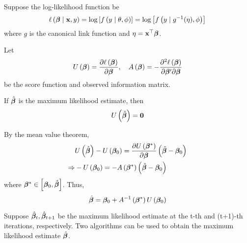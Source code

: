 Suppose the log-likelihood function be
\begin{equation}
	\ell\left(\boldsymbol{\beta}\mid{\bf x},y\right)=\log\left[f\left(y\mid\theta,\phi\right)\right]=\log\left[f\left(y\mid g^{-1}(\eta),\phi\right)\right]
\end{equation}
where $g$ is the canonical link function and $\eta={\bf x}^{\top}\boldsymbol{\beta}$.

Let
\begin{equation*}
	U\left(\boldsymbol{\beta}\right)=\frac{\partial\ell\left(\boldsymbol{\beta}\right)}{\partial\boldsymbol{\beta}},\quad A\left(\boldsymbol{\beta}\right)=-\frac{\partial^{2}\ell\left(\boldsymbol{\beta}\right)}{\partial\boldsymbol{\beta}^{\prime}\partial\boldsymbol{\beta}}
\end{equation*}
be the score function and observed information matrix.

If $\hat{\boldsymbol{\beta}}$ is the maximum likelihood estimate, then
\begin{equation*}
	U\left(\hat{\boldsymbol{\beta}}\right)=\mathbf{0}
\end{equation*}

By the mean value theorem,
\begin{equation*}
	\begin{aligned}
		            & U\left(\hat{\boldsymbol{\beta}}\right)-U\left(\boldsymbol{\beta}_{0}\right)=\frac{\partial U\left(\boldsymbol{\beta}^{*}\right)}{\partial\boldsymbol{\beta}}\left(\hat{\boldsymbol{\beta}}-\boldsymbol{\beta}_{0}\right) \\
		\Rightarrow & -U\left(\boldsymbol{\beta}_{0}\right)=-A\left(\boldsymbol{\beta}^{*}\right)\left(\hat{\boldsymbol{\beta}}-\boldsymbol{\beta}_{0}\right)
	\end{aligned}
\end{equation*}
where $\boldsymbol{\beta}^{*}\in\left[\boldsymbol{\beta}_{0},\hat{\boldsymbol{\beta}}\right]$. Thus,
\begin{equation*}
	\hat{\boldsymbol{\beta}}=\boldsymbol{\beta}_{0}+A^{-1}\left(\boldsymbol{\beta}^{*}\right)U\left(\boldsymbol{\beta}_{0}\right)
\end{equation*}

Suppose $\hat{\boldsymbol{\beta}}_{t},\hat{\boldsymbol{\beta}}_{t+1}$ be the maximum likelihood estimate at the t-th and (t+1)-th iterations, respectively. Two algorithms can be used to obtain the maximum likelihood estimate $\hat{\boldsymbol{\beta}}$.

